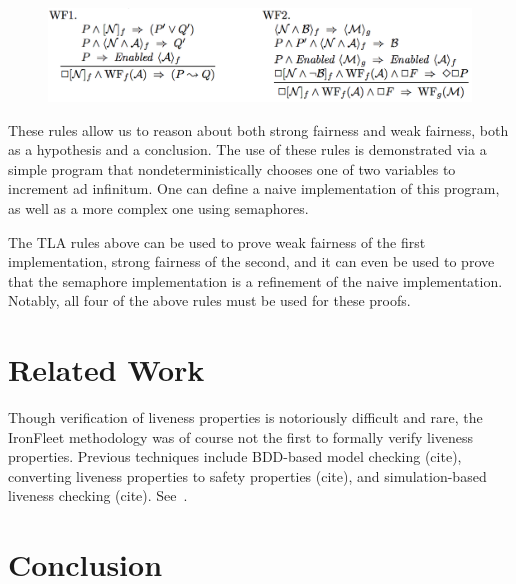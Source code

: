 \documentclass{llncs}
\begin{document}
\begin{figure}
\includegraphics[scale=0.6]{tla-rules}
\centering
\end{figure}

These rules allow us to reason about both strong fairness and weak fairness,
both as a hypothesis and a conclusion. The use of these rules is demonstrated
via a simple program that nondeterministically chooses one of two variables to
increment ad infinitum. One can define a naive implementation of this program,
as well as a more complex one using semaphores.

The TLA rules above can be used to prove weak fairness of the first
implementation, strong fairness of the second, and it can even be used to prove
that the semaphore implementation is a refinement of the naive implementation.
Notably, all four of the above rules must be used for these proofs.


\section{Related Work}\label{sec:rel-work}
Though verification of liveness properties is notoriously difficult and rare,
the IronFleet methodology was of course not the first to formally verify
liveness properties. Previous techniques include BDD-based model checking
(cite), converting liveness properties to safety properties (cite), and
simulation-based liveness checking (cite).  See~\cite{other-liveness}.
%
\section{Conclusion}

%
%



\end{document}
